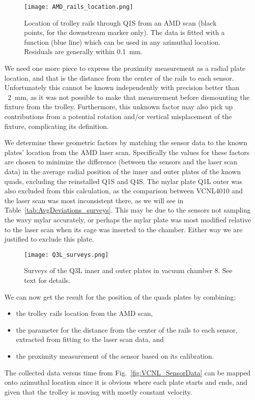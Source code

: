 \begin{figure}[]
	\centering
	\texttt{[image: AMD\_rails\_location.png]}
	\caption{Location of trolley rails through Q1S from an AMD scan (black points, for the downstream marker only). The data is fitted with a function (blue line) which can be used in any azimuthal location. Residuals are generally within \SI{0.1}{mm}.
	}\label{fig:AMD_rails_location}
\end{figure}


We need one more piece to express the proximity measurement as a radial plate location, and that is the distance from the center of the rails to each sensor. 
Unfortunately this cannot be known independently with precision better than ~\SI{2}{mm}, as it was not possible to make that measurement before dismounting the fixture from the trolley. 
Furthermore, this unknown factor may also pick up contributions from a potential rotation and/or vertical misplacement of the fixture, complicating its definition.

We determine these geometric factors by matching the sensor data to the known plates' location from the AMD laser scan. Specifically the values for these factors are chosen to minimize the difference (between the sensors and the laser scan data) in the average radial position of the inner and outer plates of the known quads, \ie excluding  the reinstalled Q1S and Q4S.
The mylar plate Q1L outer was also excluded from this calculation, as the comparison between VCNL4010 and the laser scan was most inconsistent there, as we will see in Table~\ref{tab:AvgDeviations_surveys}. This may be due to the sensors not sampling the wavy mylar accurately, or perhaps the mylar plate was most modified relative to the laser scan when its cage was inserted to the chamber. Either way we are justified to exclude this plate.



\begin{figure}[]
	\centering
	\texttt{[image: Q3L\_surveys.png]}
	\caption{Surveys of the Q3L inner and outer plates in vacuum chamber 8. See text for details.
	}\label{fig:Q3L_surveys}
\end{figure}


We can now get the result for the position of the quads plates by combining:
\begin{itemize}
\item the trolley rails location from the AMD scan, 
\item the parameter for the distance from the center of the rails to each sensor, extracted from fitting to the laser scan data, and
\item the proximity measurement of the sensor based on its calibration. 
\end{itemize}
The collected data versus time from Fig.~\ref{fig:VCNL_SensorData} can be mapped onto azimuthal location since it is obvious where each plate starts and ends, and given that the trolley is moving with mostly constant velocity. 

